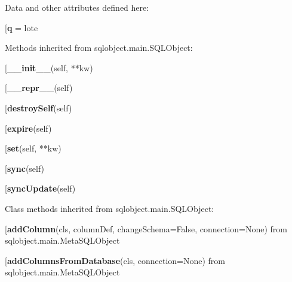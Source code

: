 Data and other attributes defined here:\\
\begin{description}\item[{\bf q} = lote\end{description}


Methods inherited from sqlobject.main.SQLObject:\\
\begin{description}\item[{\bf \_\_init\_\_}(self, **kw)\end{description}

\begin{description}\item[{\bf \_\_repr\_\_}(self)\end{description}

\begin{description}\item[{\bf destroySelf}(self)\end{description}

\begin{description}\item[{\bf expire}(self)\end{description}

\begin{description}\item[{\bf set}(self, **kw)\end{description}

\begin{description}\item[{\bf sync}(self)\end{description}

\begin{description}\item[{\bf syncUpdate}(self)\end{description}


Class methods inherited from sqlobject.main.SQLObject:\\
\begin{description}\item[{\bf addColumn}(cls, columnDef, changeSchema=False, connection=None) from sqlobject.main.MetaSQLObject\end{description}

\begin{description}\item[{\bf addColumnsFromDatabase}(cls, connection=None) from sqlobject.main.MetaSQLObject\end{description}


